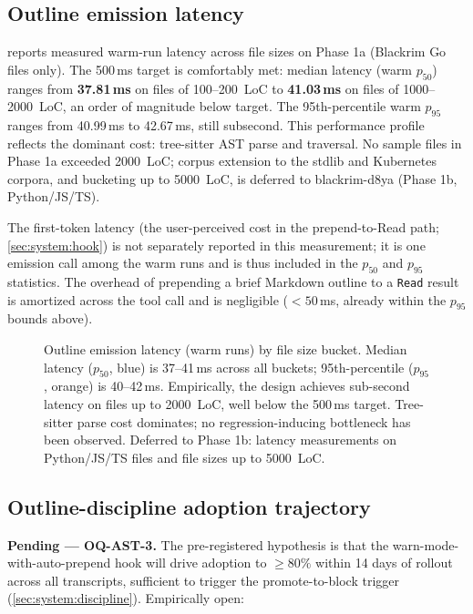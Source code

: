 \subsection{Outline emission latency}
\label{sec:eval:latency}

 reports measured warm-run latency across file sizes
on Phase 1a (Blackrim Go files only). The 500\,ms target is comfortably
met: median latency (warm $p_{50}$) ranges from \textbf{37.81\,ms}
on files of 100--200~LoC to \textbf{41.03\,ms} on files of 1000--2000~LoC,
an order of magnitude below target. The 95th-percentile warm $p_{95}$
ranges from 40.99\,ms to 42.67\,ms, still subsecond. This performance
profile reflects the dominant cost: tree-sitter AST parse and traversal.
No sample files in Phase 1a exceeded 2000~LoC; corpus extension to
the stdlib and Kubernetes corpora, and bucketing up to 5000~LoC, is
deferred to blackrim-d8ya (Phase 1b, Python/JS/TS).

The first-token latency (the user-perceived cost in the prepend-to-Read
path; \cref{sec:system:hook}) is not separately reported in this
measurement; it is one emission call among the warm runs and is
thus included in the $p_{50}$ and $p_{95}$ statistics. The overhead
of prepending a brief Markdown outline to a \texttt{Read} result is
amortized across the tool call and is negligible ($< 50$\,ms,
already within the $p_{95}$ bounds above).

\begin{figure}[ht]
\centering

\caption{Outline emission latency (warm runs) by file size bucket.
Median latency ($p_{50}$, blue) is 37--41\,ms across all buckets;
95th-percentile ($p_{95}$, orange) is 40--42\,ms. Empirically, the
design achieves sub-second latency on files up to 2000~LoC, well
below the 500\,ms target. Tree-sitter parse cost dominates; no
regression-inducing bottleneck has been observed. Deferred to Phase 1b:
latency measurements on Python/JS/TS files and file sizes up to 5000~LoC.}
\label{fig:latency}
\end{figure}

\subsection{Outline-discipline adoption trajectory}
\label{sec:eval:adoption}

\textbf{Pending --- OQ-AST-3.} The pre-registered hypothesis is that
the warn-mode-with-auto-prepend hook will drive adoption to $\geq
80\%$ within 14 days of rollout across all transcripts, sufficient to
trigger the promote-to-block trigger
(\cref{sec:system:discipline}). Empirically open:

